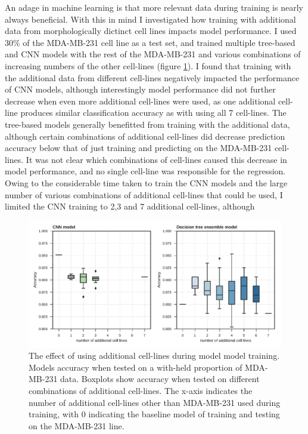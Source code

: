 \documentclass[a4paper,11pt,twoside,openright]{scrbook}
\begin{document}
An adage in machine learning is that more relevant data during training is nearly always beneficial.
With this in mind I investigated how training with additional data from morphologically dictinct cell lines impacts model performance.
I used 30\% of the MDA-MB-231 cell line as a test set, and trained multiple tree-based and CNN models with the rest of the MDA-MB-231 and various combinations of increasing numbers of the other cell-lines (figure \ref{figure:cumulative_training}).
I found that training with the additional data from different cell-lines negatively impacted the performance of CNN models, although interestingly model performance did not further decrease when even more additional cell-lines were used, as one additional cell-line produces similar classification accuracy as with using all 7 cell-lines.
The tree-based models generally benefitted from training with the additional data, although certain combinations of additional cell-lines did decrease prediction accuracy below that of just training and predicting on the MDA-MB-231 cell-lines.
It was not clear which combinations of cell-lines caused this decrease in model performance, and no single cell-line was responsible for the regression.
Owing to the considerable time taken to train the CNN models and the large number of various combinations of additional cell-lines that could be used, I limited the CNN training to 2,3 and 7 additional cell-lines, although


\begin{figure}
    \includegraphics[width=1.0\textwidth]{ch2CumulativeTraining}
    \captionsetup{width=0.8\textwidth}
    \caption[The effect of using additional cell-lines during model training]{
        The effect of using additional cell-lines during model model training.
        Models accuracy when tested on a with-held proportion of MDA-MB-231 data.
        Boxplots show accuracy when tested on different combinations of additional cell-lines.
        The x-axis indicates the number of additional cell-lines other than MDA-MB-231 used during training, with 0 indicating the baseline model of training and testing on the MDA-MB-231 line.
    }
    \label{figure:cumulative_training}
\end{figure}
\end{document}
